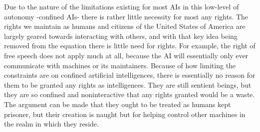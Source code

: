 Due to the nature of the limitations existing for most AIs in this low-level of autonomy -confined AIs- there is rather little necessity for most any rights. The rights we maintain as humans and citizens of the United States of America are largely geared towards interacting with others, and with that key idea being removed from the equation there is little need for rights. For example, the right of free speech does not apply much at all, because the AI will essentially only ever communicate with machines or its maintainers. Because of how limiting the constraints are on confined artificial intelligences, there is essentially no reason for them to be granted any rights as intelligences. They are still sentient beings, but they are so confined and noninteractive that any rights granted would be a waste. The argument can be made that they ought to be treated as humans kept prisoner, but their creation is naught but for helping control other machines in the realm in which they reside.